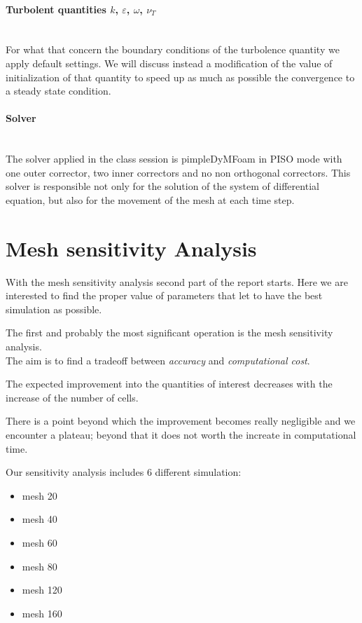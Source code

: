 \documentclass[a4paper,12pt]{article}
\begin{document}
\paragraph{Turbolent quantities $k$, $\varepsilon$, $\omega$, $\nu_T$}\mbox{}\\
For what that concern the boundary conditions of the turbolence quantity we apply default settings.
We will discuss instead a modification of the value of initialization of that quantity to speed up as much as possible the convergence to a steady state condition.

\paragraph{Solver}\mbox{}\\
The solver applied in the class session is pimpleDyMFoam in PISO mode with one outer corrector, two inner correctors and no non orthogonal correctors. This solver is responsible not only for the solution of the system of differential equation, but also for the movement of the mesh at each time step. 

\section{Mesh sensitivity Analysis}
With the mesh sensitivity analysis second part of the report starts. Here we are interested to find the proper value of parameters that let to have the best simulation as possible.

The first and probably the most significant operation is the mesh sensitivity analysis.
\\
The aim is to find a tradeoff between \emph{accuracy} and \emph{computational cost}. 

The expected improvement into the quantities of interest decreases with the increase of the number of cells.

There is a point beyond which the improvement becomes really negligible and we encounter a plateau; beyond that it does not worth the increate in computational time. 

Our sensitivity analysis includes 6 different simulation:
\begin{itemize}
\item mesh 20
\item mesh 40
\item mesh 60
\item mesh 80
\item mesh 120
\item mesh 160
\end{itemize}
\end{document}
